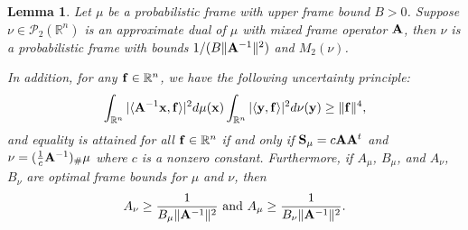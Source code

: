 \documentclass[10pt,a4paper]{amsart}
\newtheorem{lemma}{Lemma}
\begin{document}
\begin{lemma}\label{DualIsFrame}
Let $\mu$ be a probabilistic frame with upper frame bound $B>0$.  Suppose $\nu \in \mathcal{P}_2(\mathbb{R}^n)$ is an approximate dual of $\mu$ with mixed frame operator $\bf A$, then $\nu$ is a probabilistic frame with bounds $ 1/(B \| {\bf A}^{-1}\|^2)$ and $M_2(\nu)$. 

In addition, for any ${\bf f} \in \mathbb{R}^n$, we have the following uncertainty principle:
     \begin{equation*}
        \int_{\mathbb{R}^n} |\langle {\bf A }^{-1} {\bf x}, {\bf f} \rangle |^2 d\mu({\bf x}) \int_{\mathbb{R}^n} |\langle {\bf y}, {\bf f} \rangle |^2 d\nu({\bf y})  \geq \| {\bf f} \|^4,
    \end{equation*}
and equality is attained for all ${\bf f} \in \mathbb{R}^n$  if and only if  ${\bf S}_{\mu}=c{\bf A}{\bf A}^{t}$ and
$\nu=(\frac{1}{c}{\bf A}^{-1})_{\#}\mu$ where $c$ is a nonzero constant.
Furthermore, if $A_\mu$, $B_\mu$, and $A_\nu$, $B_\nu$ are optimal frame bounds for $\mu$ and $\nu$, then 
\begin{equation*}
    A_\nu \geq \frac{1}{B_\mu \| {\bf A}^{-1}\|^2} \ \text{and} \  A_\mu \geq \frac{1}{B_\nu \| {\bf A}^{-1}\|^2}.
\end{equation*}
\end{lemma}
\end{document}
